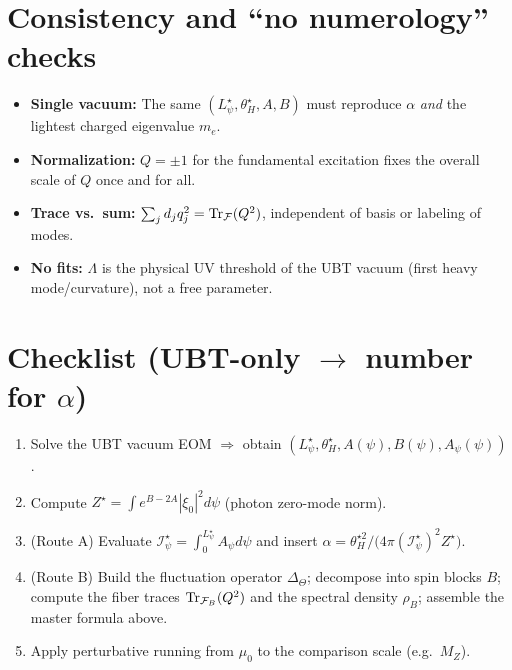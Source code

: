 \documentclass[12pt]{article}
\begin{document}
\section{Consistency and ``no numerology'' checks}
\begin{itemize}
\item \textbf{Single vacuum:} The same $(L_\psi^\star,\theta_H^\star,A,B)$ must reproduce $\alpha$ \emph{and} the lightest charged eigenvalue $m_e$.
\item \textbf{Normalization:} $Q=\pm1$ for the fundamental excitation fixes the overall scale of $Q$ once and for all.
\item \textbf{Trace vs.\ sum:} $\sum_j d_j q_j^2 = \Tr_{\mathcal F}(Q^2)$, independent of basis or labeling of modes.
\item \textbf{No fits:} $\Lambda$ is the physical UV threshold of the UBT vacuum (first heavy mode/curvature), not a free parameter.
\end{itemize}

\section*{Checklist (UBT-only $\to$ number for $\alpha$)}
\begin{enumerate}
\item Solve the UBT vacuum EOM $\Rightarrow$ obtain $(L_\psi^\star,\theta_H^\star,A(\psi),B(\psi),A_\psi(\psi))$.
\item Compute $Z^\star=\int e^{B-2A}|\xi_0|^2 d\psi$ (photon zero-mode norm).
\item (Route A) Evaluate $\mathcal I_\psi^\star=\int_0^{L_\psi^\star}\! A_\psi d\psi$ and insert
$\alpha=\theta_H^{\star 2}/\big(4\pi(\mathcal I_\psi^\star)^2 Z^\star\big)$.
\item (Route B) Build the fluctuation operator $\Delta_\Theta$; decompose into spin blocks $B$; compute the fiber traces $\Tr_{\mathcal F_B}(Q^2)$ and the spectral density $\rho_B$; assemble the master formula above.
\item Apply perturbative running from $\mu_0$ to the comparison scale (e.g.\ $M_Z$).
\end{enumerate}
\end{document}
